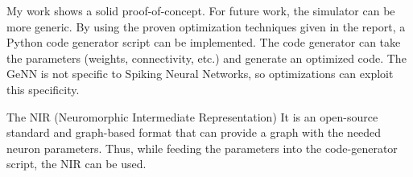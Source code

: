 \documentclass[conference]{IEEEtran}
\begin{document}
My work shows a solid proof-of-concept. 
For future work, the simulator can be more generic.
By using the proven optimization techniques given in the report, a Python code generator script can be implemented. 
The code generator can take the parameters (weights, connectivity, etc.) and generate an optimized code. 
The GeNN is not specific to Spiking Neural Networks, so optimizations can exploit this specificity. 


The NIR (Neuromorphic Intermediate Representation) \cite{pedersen2024neuromorphic} 
It is an open-source standard and graph-based format that can provide a graph with the needed neuron parameters. 
Thus, while feeding the parameters into the code-generator script, the NIR can be used.




\end{document}
